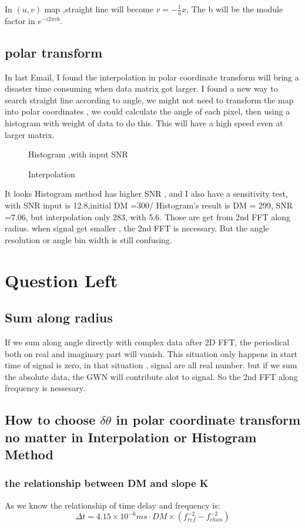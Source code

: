 \documentclass{aastex61}
\begin{document}
In $(u,v)$ map ,straight line will become $v=-\frac{1}{a} x$, The b will be the module factor in $e^{-i2\pi vb}$.  


\subsection{polar transform}

In last Email, I found the interpolation in polar coordinate transform will bring a disaster time  consuming when data matrix got larger. I found a new way to search straight line according to angle,  we might not need to transform the map into polar coordinates , we could calculate the angle of each pixel, then using a histogram with weight of data to do this. This will have a high speed even at larger matrix. 
\begin{figure}[ht!]
\caption{Histogram ,with input SNR \label{fig:histogram}}
\caption{Interpolation \label{fig:interpolation}}
\end{figure}
It looks Histogram method has higher SNR , and I also have a sensitivity test, with SNR input is 12.8,initial DM =300/
Histogram's result is DM = 299, SNR =7.06, but interpolation only 283, with 5.6.  Those are get from 2nd FFT along radius. when signal get smaller , the 2nd FFT is necessary. But the angle resolution or angle bin width is still confusing.
\section{Question Left}
\subsection{Sum along radius}
If we sum along angle directly with complex data after 2D FFT, the periodical both on real and imaginary part will vanish. This situation only happens in start time of signal is zero, in that situation , signal are all real number. but if we sum the absolute data, the GWN will contribute alot to signal. So the 2nd FFT along frequency is nessesary.
\subsection{How to choose $\delta \theta$ in polar coordinate transform no matter in Interpolation or Histogram Method}
\subsubsection{the relationship between DM and slope K}
As we know the relationship of time delay and frequency is:
\begin{equation}
\Delta t = 4.15 \times 10 ^{-6}ms \cdot DM \times (f^{-2}_{ref} -f^{-2}_{chan})
\end{equation}
\end{document}
